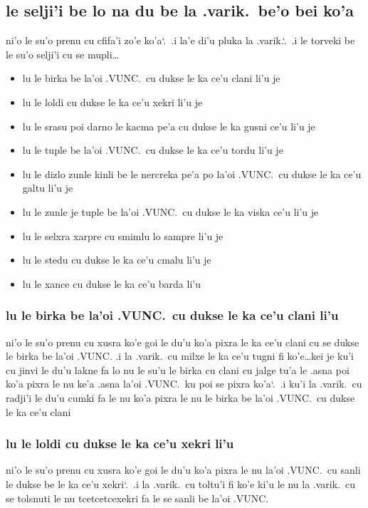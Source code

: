 \documentclass{report}
\newcommand\sds{\spacefactor\sfcode`.\ \space}
\begin{document}
\subsection{le selji'i be lo na du be la .varik.\ be'o bei ko'a}
ni'o le su'o prenu cu cfifa'i zo'e ko'a\sds  .i la'e di'u pluka la .varik.\sds  .i le torveki be le su'o selji'i cu se mupli\ldots
\begin{itemize}
	\item lu le birka be la'oi .VUNC.\ cu dukse le ka ce'u clani li'u je
	\item lu le loldi cu dukse le ka ce'u xekri li'u je
	\item lu le srasu poi darno le kacma pe'a cu dukse le ka gusni ce'u li'u je
	\item lu le tuple be la'oi .VUNC.\ cu dukse le ka ce'u tordu li'u je
	\item lu le dizlo zunle kinli be le nercreka pe'a po la'oi .VUNC.\ cu dukse le ka ce'u galtu li'u je
	\item lu le zunle je tuple be la'oi .VUNC.\ cu dukse le ka viska ce'u li'u je
	\item lu le selxra xarpre cu smimlu lo sampre li'u je
	\item lu le stedu cu dukse le ka ce'u cmalu li'u je
	\item lu le xance cu dukse le ka ce'u barda li'u
\end{itemize}

\subsubsection{lu le birka be la'oi .VUNC.\ cu dukse le ka ce'u clani li'u}
ni'o le su'o prenu cu xusra ko'e goi le du'u ko'a pixra le ka ce'u clani cu se dukse le birka be la'oi .VUNC.  .i la .varik.\ cu milxe le ka ce'u tugni fi ko'e\ldots kei je ku'i cu jinvi le du'u lakne fa lo nu le su'u le birka cu clani cu jalge tu'a le .asna poi ko'a pixra le nu ke'a .asna la'oi .VUNC.\ ku poi se pixra ko'a\sds  .i ku'i la .varik.\ cu radji'i le du'u cumki fa le nu ko'a pixra le nu le birka be la'oi .VUNC.\ cu dukse le ka ce'u clani

\subsubsection{lu le loldi cu dukse le ka ce'u xekri li'u}
ni'o le su'o prenu cu xusra ko'e goi le du'u ko'a pixra le nu la'oi .VUNC.\ cu sanli le dukse be le ka ce'u xekri\sds  .i la .varik.\ cu toltu'i fi ko'e ki'u le nu la .varik.\ cu se tolsnuti le nu tcetcetcexekri fa le se sanli be la'oi .VUNC.
\end{document}
